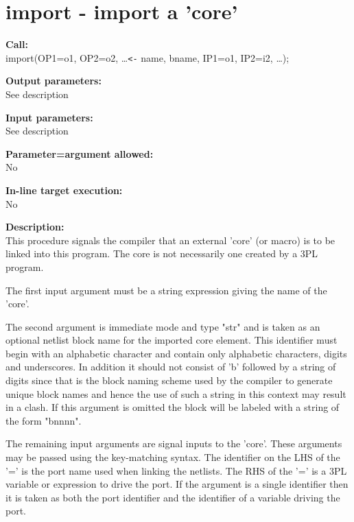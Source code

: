     \section{import - import a 'core'}\label{sec:ipimport}
        
        {\bf Call:} \\
        import(OP1=o1, OP2=o2, \dots \verb'<-' name, bname, IP1=o1, IP2=i2, \dots);
        
        {\bf Output parameters:} \\
        See description
        
        {\bf Input parameters:} \\
        See description
        
        {\bf Parameter=argument allowed:} \\
        No
        
        {\bf In-line target execution:} \\
        No
        
        {\bf Description:} \\
        This procedure signals the compiler that an external 'core'
        (or macro) is to be linked into this program. The core is
        not necessarily one created by a 3PL program.        
        
        The first input argument must be a string expression giving the
        name of the 'core'.
        
        The second argument is immediate mode and type "str" and is taken as an
        optional netlist block name for the imported core element. This
        identifier must begin with an alphabetic character and contain only
        alphabetic characters, digits and underscores. In addition it should not
        consist of 'b' followed by a string of digits since that is the block
        naming scheme used by the compiler to generate unique block names and
        hence the use of such a string in this context may result in a clash. If
        this argument is omitted the block will be labeled with a string of the
        form "bnnnn".
        
        The remaining input arguments are signal inputs to the 'core'. These
        arguments may be passed using the key-matching syntax. The identifier on
        the LHS of the '=' is the port name used when linking the netlists. The
        RHS of the '=' is a 3PL variable or expression to drive the port. If the
        argument is a single identifier then it is taken as both the port
        identifier and the identifier of a variable driving the port.
        
